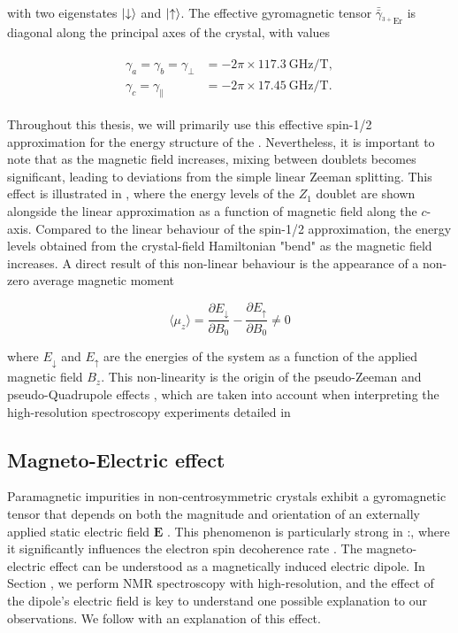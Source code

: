 with two eigenstates $\ket{\downarrow}$ and $\ket{\uparrow}$. The effective gyromagnetic tensor $\bar{\bar{\gamma}}_{^{3+}\text{Er}}$ is diagonal along the principal axes of the crystal, with values 

\begin{align}
\begin{split}
    \gamma_a = \gamma_b = \gamma_\perp &= -2\pi \times 117.3~\text{GHz/T}, \\
    \gamma_c = \gamma_\parallel &= -2\pi \times 17.45~\text{GHz/T}.
\end{split}
\end{align}

Throughout this thesis, we will primarily use this effective spin-1/2 approximation for the energy structure of the \Er. Nevertheless, it is important to note that as the magnetic field increases, mixing between doublets becomes significant, leading to deviations from the simple linear Zeeman splitting. This effect is illustrated in , where the energy levels of the $Z_1$ doublet are shown alongside the linear approximation as a function of magnetic field along the $c$-axis. Compared to the linear behaviour of the spin-1/2 approximation, the energy levels obtained from the crystal-field Hamiltonian "bend" as the magnetic field increases. A direct result of this non-linear behaviour is the appearance of a non-zero average magnetic moment

\begin{equation}
    \langle \mu_z \rangle = \frac{\partial E_\downarrow}{\partial B_0} - \frac{\partial E_\uparrow}{\partial B_0} \neq 0
\end{equation}

where $E_\downarrow$ and $E_\uparrow$ are the energies of the system as a function of the applied magnetic field $B_z$. This non-linearity is the origin of the pseudo-Zeeman  and pseudo-Quadrupole effects , which are taken into account when interpreting the high-resolution spectroscopy experiments detailed in 

\subsection{Magneto-Electric effect}
\label{sec:magneto-optic}

Paramagnetic impurities in non-centrosymmetric crystals exhibit a gyromagnetic tensor that depends on both the magnitude and orientation of an externally applied static electric field $\mathbf{E}$ . This phenomenon is particularly strong in \Er:\Ca {}, where it significantly influences the electron spin decoherence rate . The magneto-electric effect can be understood as a magnetically induced electric dipole. In Section , we perform NMR spectroscopy with high-resolution, and the effect of the dipole's electric field is key to understand one possible explanation to our observations. We follow with an explanation of this effect.

